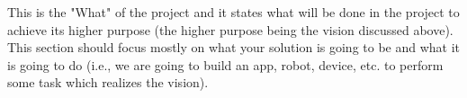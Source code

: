 This is the "What" of the project and it states what will be done in the project to achieve its higher purpose (the higher purpose being the vision discussed above). This section should focus mostly on what your solution is going to be and what it is going to do (i.e., we are going to build an app, robot, device, etc. to perform some task which realizes the vision).